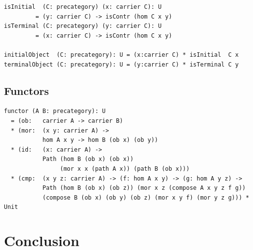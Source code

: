 \documentclass{article}
\begin{document}
\begin{lstlisting}[mathescape=true]
isInitial  (C: precategory) (x: carrier C): U
         = (y: carrier C) -> isContr (hom C x y)
isTerminal (C: precategory) (y: carrier C): U
         = (x: carrier C) -> isContr (hom C x y)

initialObject  (C: precategory): U = (x:carrier C) * isInitial  C x
terminalObject (C: precategory): U = (y:carrier C) * isTerminal C y
\end{lstlisting}

\subsection{Functors}

\begin{lstlisting}[mathescape=true]
functor (A B: precategory): U
  = (ob:   carrier A -> carrier B)
  * (mor:  (x y: carrier A) ->
           hom A x y -> hom B (ob x) (ob y))
  * (id:   (x: carrier A) ->
           Path (hom B (ob x) (ob x))
                (mor x x (path A x)) (path B (ob x)))
  * (cmp:  (x y z: carrier A) -> (f: hom A x y) -> (g: hom A y z) ->
           Path (hom B (ob x) (ob z)) (mor x z (compose A x y z f g))
           (compose B (ob x) (ob y) (ob z) (mor x y f) (mor y z g))) * Unit
\end{lstlisting}

\newpage
\section{Conclusion}
\end{document}

